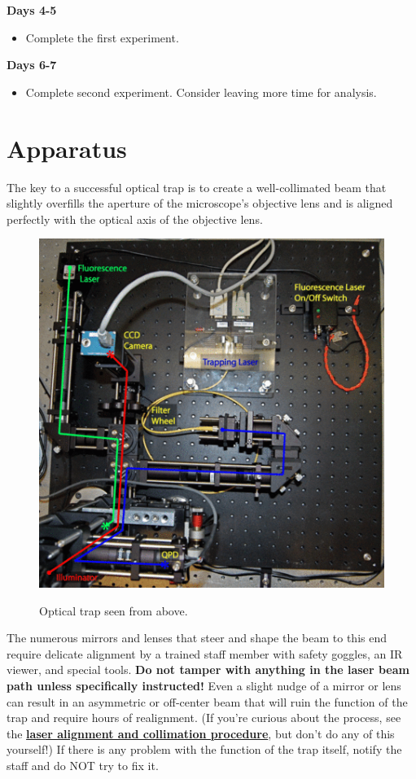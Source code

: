 \documentclass{../lab}
\begin{document}
\textbf{Days 4-5}

\begin{itemize}
    \item Complete the first experiment.
\end{itemize}

\textbf{Days 6-7}

\begin{itemize}
    \item Complete second experiment. Consider leaving more time for analysis.
\end{itemize}

\section{Apparatus}

The key to a successful optical trap is to create a well-collimated beam that slightly overfills the aperture of the microscope's objective lens and is aligned perfectly with the optical axis of the objective lens.

\begin{figure}[h]
    \centering
    \href{http://experimentationlab.berkeley.edu/sites/default/files/images/450px-OTZ_From_Above.gif}{\includegraphics[width=0.5\linewidth]{images/450px-OTZ_From_Above.png}}
    \caption{Optical trap seen from above.}
    \label{fig:450px-OTZ_From_Above}
\end{figure}

The numerous mirrors and lenses that steer and shape the beam to this end require delicate alignment by a trained staff member with safety goggles, an IR viewer, and special tools. \textbf{Do not tamper with anything in the laser beam path unless specifically instructed!} Even a slight nudge of a mirror or lens can result in an asymmetric or off-center beam that will ruin the function of the trap and require hours of realignment. (If you're curious about the process, see the \href{http://experimentationlab.berkeley.edu/DesignandDocumentationOTZ#Laser\_Alignment\_and\_Collimation}{\textbf{laser alignment and collimation procedure}}, but don't do any of this yourself!) If there is any problem with the function of the trap itself, notify the staff and do NOT try to fix it.
\end{document}
